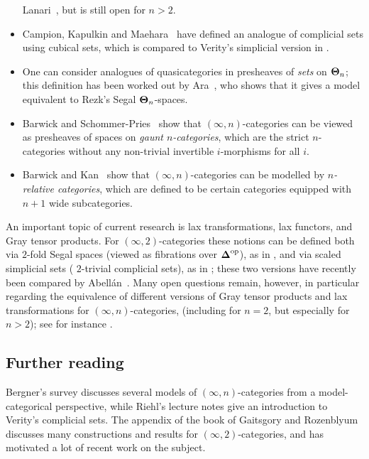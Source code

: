 \documentclass[a4paper,11pt]{article}
\begin{document}
\begin{remark}
\begin{itemize}
    Lanari~\cite{GHL}, but is still open for $n > 2$.
  \item Campion, Kapulkin and Maehara~\cite{CKMCube} have defined an
    analogue of complicial sets using cubical sets, which is compared to
    Verity's simplicial version in \cite{DKMCube}.
  \item One can consider analogues of quasicategories in presheaves of
    \emph{sets} on $\boldsymbol{\Theta}_{n}$; this definition has been worked out by
    Ara~\cite{AraTheta}, who shows that it gives a model equivalent to
    Rezk's Segal $\boldsymbol{\Theta}_{n}$-spaces.
  \item Barwick and Schommer-Pries~\cite{BSP} show that
    $(\infty,n)$-categories can be viewed as presheaves of spaces on
    \emph{gaunt $n$-categories}, which are the strict $n$-categories
    without any non-trivial invertible $i$-morphisms for all $i$.
  \item Barwick and Kan~\cite{BarwickKanN} show that
    $(\infty,n)$-categories can be modelled by \emph{$n$-relative
      categories}, which are defined to be certain categories equipped
    with $n+1$ wide subcategories.
  \end{itemize}
\end{remark}

\begin{remark}
  An important topic of current research is lax transformations, lax
  functors, and Gray tensor products. For $(\infty,2)$-categories
  these notions can be defined both via $2$-fold Segal spaces (viewed as
  fibrations over $\boldsymbol{\Delta}^{\text{\textup{op}}}$), as in \cite{GR}, and via scaled simplicial
  sets (\ie{} $2$-trivial complicial sets), as in \cite{GHLGray}; these
  two versions have recently been compared by
  Abell\'an~\cite{Abellan}. Many open questions remain, however, in
  particular regarding the equivalence of different versions of Gray
  tensor products and lax transformations for $(\infty,n)$-categories,
  (including for $n = 2$, but especially for $n > 2$); see for
  instance \cite{JFS,ORV,CampionGray}.
\end{remark}

\subsection{Further reading}
Bergner's survey \cite{BergnerSurvey} discusses several models of
$(\infty,n)$-categories from a
model-categorical perspective, while Riehl's lecture notes
\cite{RiehlCompl} give an introduction to Verity's complicial
sets. The appendix of the book of Gaitsgory and Rozenblyum \cite{GR}
discusses many constructions and results for $(\infty,2)$-categories,
and has motivated a lot of recent work on the subject.
\end{document}
